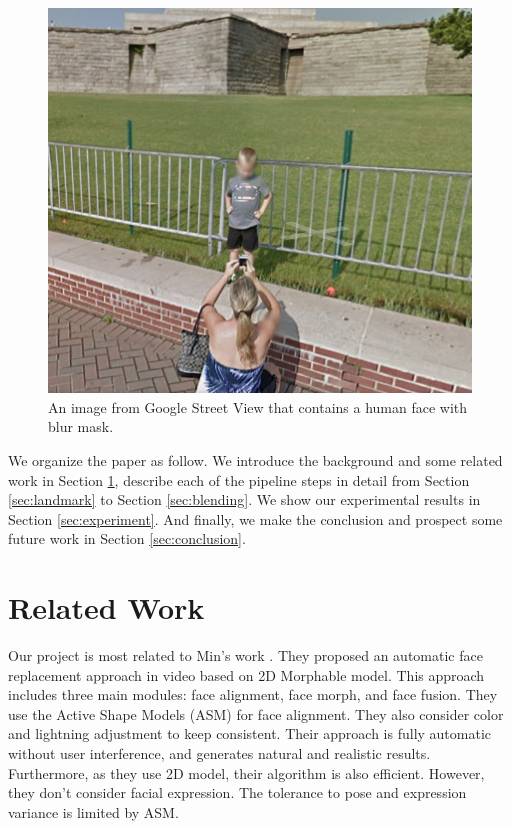 \documentclass[10pt,twocolumn,letterpaper]{article}
\begin{document}
\begin{figure}[t]
\begin{center}
   \includegraphics[width=0.8\linewidth]{fig/fig1.png}
\end{center}
   \caption{An image from Google Street View that contains a human face with blur mask.}
\label{fig:gsv}
\end{figure}

\indent We organize the paper as follow. We introduce the background and some related work in Section \ref{sec:relatedwork}, describe each of the pipeline steps in detail from Section \ref{sec:landmark} to Section \ref{sec:blending}. We show our experimental results in Section \ref{sec:experiment}. And finally, we make the conclusion and prospect some future work in Section \ref{sec:conclusion}.

\section{Related Work}
\label{sec:relatedwork}
Our project is most related to Min's work \cite{min2010automatic}. They proposed an automatic face
replacement approach in video based on 2D Morphable model. This approach includes three main modules: face alignment, face morph, and face fusion. They use the Active Shape Models (ASM) for face alignment. They also consider color and lightning adjustment to keep consistent. Their approach is fully automatic without user interference, and generates natural and realistic results. Furthermore, as they use 2D model, their algorithm is also efficient. However, they don't consider facial expression. The tolerance to pose and expression variance is limited by ASM.
\end{document}
